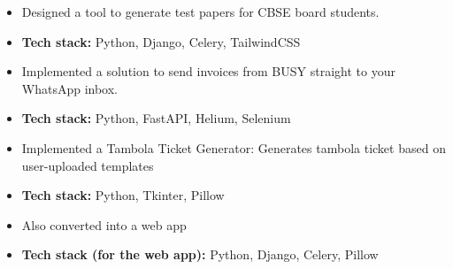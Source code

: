 \documentclass[10pt,a4paper,withhyper]{altacv}
\begin{document}
\begin{paracol}{2}





\begin{itemize}
\item Designed a tool to generate test papers for CBSE board students.
\item \textbf{Tech stack:} Python, Django, Celery, TailwindCSS
\end{itemize}

\divider

\begin{itemize}
  \item Implemented a solution to send invoices from BUSY straight to your WhatsApp inbox.
  \item \textbf{Tech stack:} Python, FastAPI, Helium, Selenium
\end{itemize}

\divider

\begin{itemize}
\item Implemented a Tambola Ticket Generator: Generates tambola ticket based on user-uploaded templates
\item \textbf{Tech stack:} Python, Tkinter, Pillow
\item Also converted into a web app
\item \textbf{Tech stack (for the web app):} Python, Django, Celery, Pillow
\end{itemize}


\end{paracol}
\end{document}
